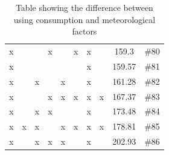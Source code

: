 \begin{table}[H]
{\begin{tabular}{c c c c c c c c c c}
 x &  &  &  x &  &  x &  x &  & 159.3 & \#80 \\
 x &  &  &  &  &  &  x &  & 159.57 & \#81 \\
 x &  &  x &  &  x &  &  x &  & 161.28 & \#82 \\ [1ex]
 x &  &  &  x &  x &  x &  x &  x & 167.37 & \#83 \\ [1ex]
 x &  &  x &  x &  &  &  x &  & 173.48 & \#84 \\ [1ex]
 x &  x &  x &  &  x &  x &  x &  x & 178.81 & \#85 \\ [1ex]
 x &  &  x &  x &  x &  &  x &  & 202.93 & \#86 \\ [1ex] %
\hline %
\end{tabular}}
\caption{Table showing the difference between using consumption and meteorological factors} %
\label{table:consumptionInclusionTable} %
\end{table}

